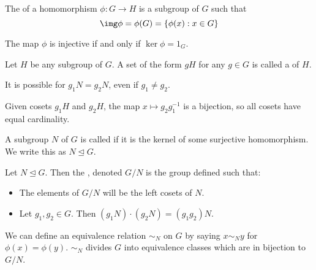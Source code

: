 \documentclass{article}
\begin{document}
\begin{defn}
  The  of a homomorphism $\phi : G \rightarrow H$ is a subgroup of $G$ such that
  $$\img \phi = \phi(G) = \{\phi(x) : x \in G \}$$
\end{defn}

\begin{prop}
  The map $\phi$ is injective if and only if $\ker \phi = {1_G}$. 
\end{prop}

\begin{defn}
  Let $H$ be any subgroup of $G$. A set of the form $gH$ for any $g \in G$ is called a
   of $H$. 
\end{defn}

\begin{remark}
  It is possible for $g_1N = g_2N$, even if $g_1 \neq g_2$. 
\end{remark}

\begin{remark}
  Given cosets $g_1H$ and $g_2H$, the map $x \mapsto g_2g_1^{-1}$ is a bijection, so
  all cosets have equal cardinality. 
\end{remark}

\begin{defn}
  A subgroup $N$ of $G$ is called  if it is the kernel of some surjective
  homomorphism. We write this as $N \trianglelefteq G$. 
\end{defn}

\begin{defn}
  Let $N \trianglelefteq G$. Then the , denoted $G/N$ is
  the group defined such that:
  \begin{itemize}
  \item The elements of $G/N$ will be the left cosets of $N$.
  \item Let $g_1, g_2 \in G$. Then $(g_1N) \cdot (g_2N) = (g_1g_2)N$. 
  \end{itemize}
\end{defn}

\begin{remark}
  We can define an equivalence relation $\sim_N$ on $G$ by saying $x \sim_N y$ for
  $\phi(x) = \phi(y)$. $\sim_N$ divides $G$ into equivalence classes which are
  in bijection to $G/N$. 
\end{remark}
\end{document}
